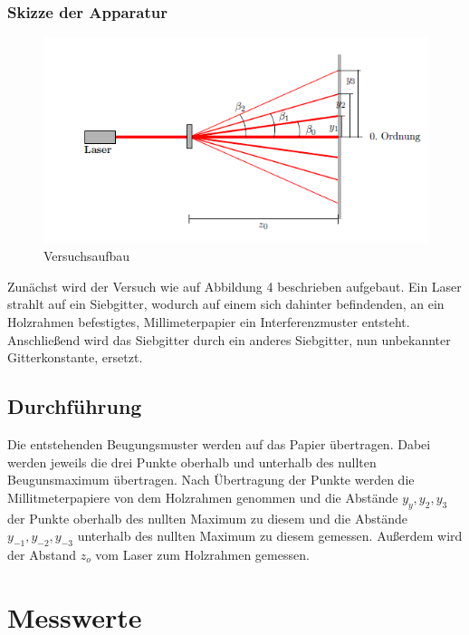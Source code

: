 \documentclass[12pt,a4paper,titlepage,headinclude,bibtotoc]{scrartcl}
\begin{document}
\subsubsection{Skizze der Apparatur}
\begin{figure} [h!]
\begin{center}
\includegraphics[scale=0.75]{Versuchsaufbau.png} \end{center}
\caption{Versuchsaufbau}
\end{figure}

Zunächst wird der Versuch wie auf Abbildung 4 beschrieben aufgebaut.
Ein Laser strahlt auf ein Siebgitter, wodurch auf einem sich dahinter befindenden, an ein Holzrahmen befestigtes, Millimeterpapier ein Interferenzmuster entsteht. Anschließend wird das Siebgitter durch ein anderes Siebgitter, nun unbekannter Gitterkonstante, ersetzt.


\subsection{Durchführung}
Die entstehenden Beugungsmuster werden auf das Papier übertragen. Dabei werden jeweils die drei Punkte  oberhalb und unterhalb des nullten Beugunsmaximum übertragen.
Nach Übertragung der Punkte werden die Millitmeterpapiere von dem Holzrahmen genommen und die Abstände $y_{y},y_{2},y_{3}$ der Punkte oberhalb des nullten Maximum zu diesem und die Abstände $y_{-1},y_{-2},y_{-3}$ unterhalb des nullten Maximum zu diesem gemessen. Außerdem wird der Abstand $z_{o}$ vom Laser zum Holzrahmen gemessen.


\section{Messwerte}
\end{document}

